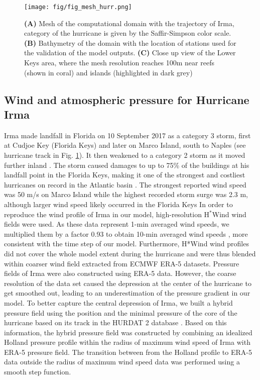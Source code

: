 \documentclass[11pt,a4paper]{article}
\begin{document}
\begin{figure}
    \centering
    \texttt{[image: fig/fig\_mesh\_hurr.png]}
    \caption{\textbf{(A)} Mesh of the computational domain with the trajectory of Irma, category of the hurricane is given by the Saffir-Simpson color scale. \textbf{(B)} Bathymetry of the domain with the location of stations used for the validation of the model outputs. \textbf{(C)} Close up view of the Lower Keys area, where the mesh resolution reaches 100m near reefs (shown in coral) and islands (highlighted in dark grey)}
    \label{fig:mesh}
\end{figure}

\subsection{Wind and atmospheric pressure for Hurricane Irma}
Irma made landfall in Florida on 10 September 2017 as a category 3 storm, first at Cudjoe Key (Florida Keys) and later on Marco Island, south to Naples (see hurricane track in Fig. \ref{fig:mesh}). It then weakened to a category 2 storm as it moved further inland \citep{pinelli2018overview}. The storm caused damages to up to 75\% of the buildings at his landfall point in the Florida Keys, making it one of the strongest and costliest hurricanes on record in the Atlantic basin \citep{xian2018brief,zhang2019modeling}. The strongest reported wind speed was 50 m/s on Marco Island while the highest recorded storm surge was 2.3 m, although larger wind speed likely occurred in the Florida Keys \citep{pinelli2018overview}
In order to reproduce the wind profile of Irma in our model, high-resolution H$^\ast$Wind \citep{powell1998hrd} wind fields were used. As these data represent 1-min averaged wind speeds, we multiplied them by a factor 0.93 to obtain 10-min averaged wind speeds \citep{harper2010guidelines}, more consistent with the time step of our model. Furthermore, H*Wind wind profiles did not cover the whole model extent during the hurricane and were thus blended within coarser wind field extracted from ECMWF ERA-5 datasets. Pressure fields of Irma were also constructed using ERA-5 data. However, the coarse resolution of the data set caused the depression at the center of the hurricane to get smoothed out, leading to an underestimation of the pressure gradient in our model. To better capture the central depression of Irma, we built a hybrid pressure field using the position and the minimal pressure of the core of the hurricane based on its track in the HURDAT 2 database \citep{landsea2013atlantic}. Based on this information, the hybrid pressure field was constructed by combining an idealized Holland pressure profile \citep{lin2012hurricane} within the radius of maximum wind speed of Irma \citep{knaff2018statistical} with ERA-5 pressure field. The transition between from the Holland profile to ERA-5 data outside the radius of maximum wind speed data was performed using a smooth step function.
\end{document}
